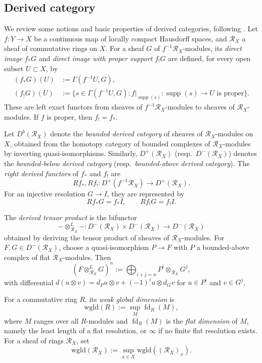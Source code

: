 \documentclass[11pt]{amsart}
\numberwithin{equation}{section}
\theoremstyle{plain}
\theoremstyle{definition}
\begin{document}
\subsection{Derived category}
\label{subsec-derived-category-preliminaries}

We review some notions and basic properties of derived categories, following \cite{KS}. Let $f:Y\longrightarrow X$ be a continuous map of locally compact
Hausdorff spaces, and $\mathcal{R}_X$ a sheaf of commutative rings on $X$.
For a sheaf $G$ of $f^{-1}\mathcal{R}_X$-modules, its \emph{direct image} $f_*G$ and
\emph{direct image with proper support} $f_!G$ are defined, for every open
subset $U\subset X$, by
\[
\begin{aligned}
(f_*G)(U)&:=\Gamma(f^{-1}U,G),\\
(f_!G)(U)&:=\{s\in\Gamma(f^{-1}U,G):
f|_{\operatorname{supp}(s)}:\operatorname{supp}(s)\to U
\text{ is proper}\}.
\end{aligned}
\]
These are left exact functors from sheaves of $f^{-1}\mathcal{R}_X$-modules to
sheaves of $\mathcal{R}_X$-modules. If $f$ is proper, then $f_!=f_*$.

Let $D^b(\mathcal{R}_X)$ denote the \emph{bounded derived category} of sheaves of
$\mathcal{R}_X$-modules on $X$, obtained from the homotopy category of bounded complexes
of $\mathcal{R}_X$-modules by
inverting quasi-isomorphisms. Similarly, $D^+(\mathcal{R}_X)$
(resp.\ $D^-(\mathcal{R}_X)$) denotes the \emph{bounded-below derived category}
(resp.\ \emph{bounded-above derived category}). The \emph{right derived functors} of $f_*$ and
$f_!$ are
\[
Rf_*,Rf_!:D^+(f^{-1}\mathcal{R}_X)\longrightarrow D^+(\mathcal{R}_X).
\]
For an injective resolution $G\to I$, they are represented by
\[
Rf_*G=f_*I,
\qquad Rf_!G=f_!I.
\]

The \emph{derived tensor product} is the bifunctor
\[
-\otimes^L_{\mathcal{R}_X}-:
D^-(\mathcal{R}_X)\times D^-(\mathcal{R}_X)
\longrightarrow D^-(\mathcal{R}_X)
\]
obtained by deriving the tensor product of sheaves of
$\mathcal{R}_X$-modules. For $F,G\in D^-(\mathcal{R}_X)$,
choose a quasi-isomorphism $P\to F$ with $P$ a
bounded-above complex of flat $\mathcal{R}_X$-modules. Then
\[
(F\otimes^L_{\mathcal{R}_X}G)^n
:=\bigoplus_{i+j=n}P^i\otimes_{\mathcal{R}_X}G^j,
\]
with differential
$d(u\otimes v)=d_Pu\otimes v+(-1)^i u\otimes d_Gv$ for $u\in P^i$ and $v\in G^j$.

For a commutative ring $R$, its \emph{weak global dimension} is
\[
\mathrm{wgld}(R):=\sup_M\operatorname{fd}_R(M),
\]
where $M$ ranges over all $R$-modules and $\operatorname{fd}_R(M)$ is the
\emph{flat dimension} of $M$, namely the least length of a flat resolution,
or $\infty$ if no finite flat
resolution exists. For a sheaf of rings $\mathcal{R}_X$, set
\[
\mathrm{wgld}(\mathcal{R}_X):=\sup_{x\in X}\mathrm{wgld}((\mathcal{R}_X)_x).
\]
\end{document}
